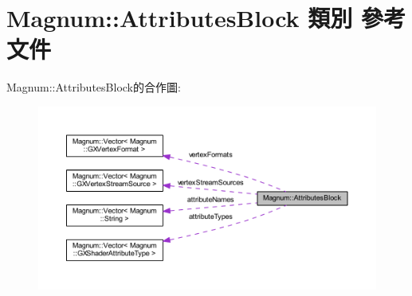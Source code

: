 \hypertarget{class_magnum_1_1_attributes_block}{}\section{Magnum\+:\+:Attributes\+Block 類別 參考文件}
\label{class_magnum_1_1_attributes_block}


Magnum\+:\+:Attributes\+Block的合作圖\+:\nopagebreak
\begin{figure}[H]
\begin{center}
\leavevmode
\includegraphics[width=350pt]{class_magnum_1_1_attributes_block__coll__graph}
\end{center}
\end{figure}
